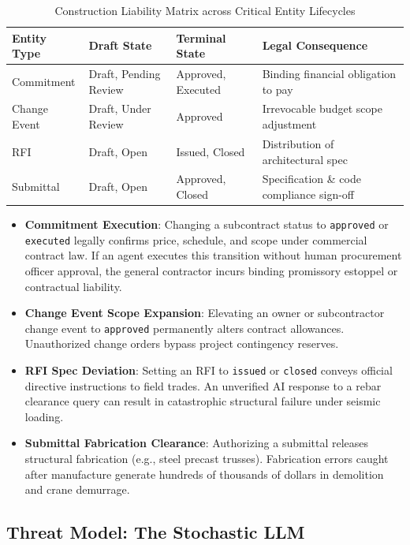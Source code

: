 \documentclass[10pt,conference,letterpaper]{article}
\begin{document}
\begin{table}[h]
\centering
\caption{Construction Liability Matrix across Critical Entity Lifecycles}
\label{tab:liability_matrix}
\begin{tabular}{llll}
\toprule
\textbf{Entity Type} & \textbf{Draft State} & \textbf{Terminal State} & \textbf{Legal Consequence} \\
\midrule
Commitment & Draft, Pending Review & Approved, Executed & Binding financial obligation to pay \\
Change Event & Draft, Under Review & Approved & Irrevocable budget scope adjustment \\
RFI & Draft, Open & Issued, Closed & Distribution of architectural spec \\
Submittal & Draft, Open & Approved, Closed & Specification \& code compliance sign-off \\
\bottomrule
\end{tabular}
\end{table}

\begin{itemize}
    \item \textbf{Commitment Execution}: Changing a subcontract status to \texttt{approved} or \texttt{executed} legally confirms price, schedule, and scope under commercial contract law. If an agent executes this transition without human procurement officer approval, the general contractor incurs binding promissory estoppel or contractual liability.
    \item \textbf{Change Event Scope Expansion}: Elevating an owner or subcontractor change event to \texttt{approved} permanently alters contract allowances. Unauthorized change orders bypass project contingency reserves.
    \item \textbf{RFI Spec Deviation}: Setting an RFI to \texttt{issued} or \texttt{closed} conveys official directive instructions to field trades. An unverified AI response to a rebar clearance query can result in catastrophic structural failure under seismic loading.
    \item \textbf{Submittal Fabrication Clearance}: Authorizing a submittal releases structural fabrication (e.g., steel precast trusses). Fabrication errors caught after manufacture generate hundreds of thousands of dollars in demolition and crane demurrage.
\end{itemize}

\subsection{Threat Model: The Stochastic LLM}
\end{document}
